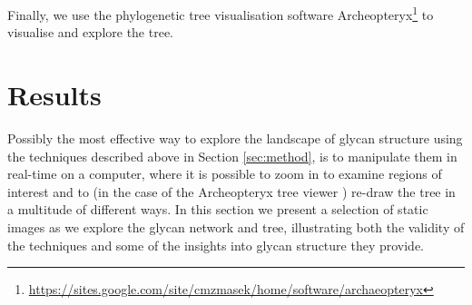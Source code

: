 \documentclass[12pt,a4paper]{article}
\begin{document}
Finally, we use the phylogenetic tree visualisation software Archeopteryx\footnote{\url{https://sites.google.com/site/cmzmasek/home/software/archaeopteryx}} to visualise and explore the tree.








\newpage
\section{Results}
\label{sec:results}

Possibly the most effective way to explore the landscape of glycan structure using the techniques described above in Section \ref{sec:method}, is to manipulate them in real-time on a computer, where it is possible to zoom in to examine regions of interest and to (in the case of the Archeopteryx tree viewer ) re-draw the tree in a multitude of different ways. In this section we present a selection of static images as we explore the glycan network and tree, illustrating both the validity of the techniques and some of the insights into glycan structure they provide.
\end{document}
